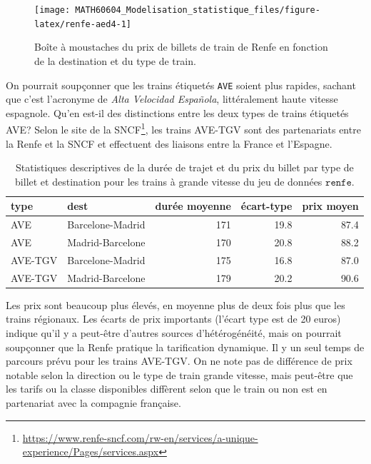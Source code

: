 \documentclass[
  11pt,
  letterpaper,
]{article}
\renewcommand{\href}[2]{#2\footnote{\url{#1}}}
\theoremstyle{definition}
\theoremstyle{definition}
\theoremstyle{definition}
\theoremstyle{definition}
\theoremstyle{remark}
\begin{document}
\begin{figure}

{\centering \texttt{[image: MATH60604\_Modelisation\_statistique\_files/figure-latex/renfe-aed4-1]} 

}

\caption{Boîte à moustaches du prix de billets de train de Renfe en fonction de la destination et du type de train.}\label{fig:renfe-aed4}
\end{figure}

On pourrait soupçonner que les trains étiquetés \texttt{AVE} soient plus rapides, sachant que c'est l'acronyme de \emph{Alta Velocidad Española}, littéralement haute vitesse espagnole. Qu'en est-il des distinctions entre les deux types de trains étiquetés AVE? Selon \href{https://www.renfe-sncf.com/rw-en/services/a-unique-experience/Pages/services.aspx}{le site de la SNCF}, les trains AVE-TGV sont des partenariats entre la Renfe et la SNCF et effectuent des liaisons entre la France et l'Espagne.

\begin{table}

\caption{\label{tab:renfe-aed5}Statistiques descriptives de la durée de trajet et du prix du billet par type de billet et destination pour les trains à grande vitesse du jeu de données $\texttt{renfe}$.}
\centering
\begin{tabular}[t]{llrrr}
\toprule
type & dest & durée moyenne & écart-type & prix moyen\\
\midrule
AVE & Barcelone-Madrid & 171 & 19.8 & 87.4\\
AVE & Madrid-Barcelone & 170 & 20.8 & 88.2\\
AVE-TGV & Barcelone-Madrid & 175 & 16.8 & 87.0\\
AVE-TGV & Madrid-Barcelone & 179 & 20.2 & 90.6\\
\bottomrule
\end{tabular}
\end{table}

Les prix sont beaucoup plus élevés, en moyenne plus de deux fois plus que les trains régionaux. Les écarts de prix importants (l'écart type est de 20 euros) indique qu'il y a peut-être d'autres sources d'hétérogénéité, mais on pourrait soupçonner que la Renfe pratique la tarification dynamique. Il y un seul temps de parcours prévu pour les trains AVE-TGV. On ne note pas de différence de prix notable selon la direction ou le type de train grande vitesse, mais peut-être que les tarifs ou la classe disponibles diffèrent selon que le train ou non est en partenariat avec la compagnie française.
\end{document}
